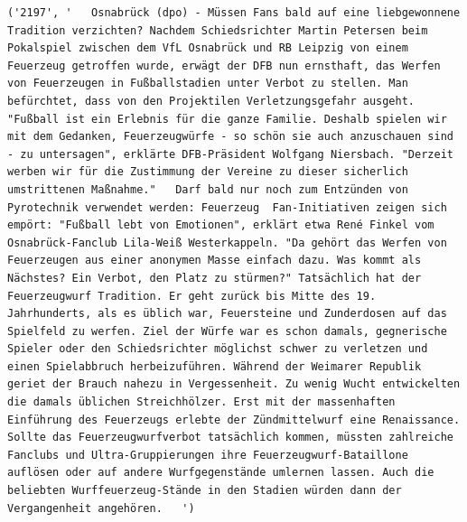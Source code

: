 \documentclass[a4paper]{scrartcl}
\begin{document}
\begin{lstlisting}
('2197', '   Osnabrück (dpo) - Müssen Fans bald auf eine liebgewonnene Tradition verzichten? Nachdem Schiedsrichter Martin Petersen beim Pokalspiel zwischen dem VfL Osnabrück und RB Leipzig von einem Feuerzeug getroffen wurde, erwägt der DFB nun ernsthaft, das Werfen von Feuerzeugen in Fußballstadien unter Verbot zu stellen. Man befürchtet, dass von den Projektilen Verletzungsgefahr ausgeht.  "Fußball ist ein Erlebnis für die ganze Familie. Deshalb spielen wir mit dem Gedanken, Feuerzeugwürfe - so schön sie auch anzuschauen sind - zu untersagen", erklärte DFB-Präsident Wolfgang Niersbach. "Derzeit werben wir für die Zustimmung der Vereine zu dieser sicherlich umstrittenen Maßnahme."   Darf bald nur noch zum Entzünden von Pyrotechnik verwendet werden: Feuerzeug  Fan-Initiativen zeigen sich empört: "Fußball lebt von Emotionen", erklärt etwa René Finkel vom Osnabrück-Fanclub Lila-Weiß Westerkappeln. "Da gehört das Werfen von Feuerzeugen aus einer anonymen Masse einfach dazu. Was kommt als Nächstes? Ein Verbot, den Platz zu stürmen?" Tatsächlich hat der Feuerzeugwurf Tradition. Er geht zurück bis Mitte des 19. Jahrhunderts, als es üblich war, Feuersteine und Zunderdosen auf das Spielfeld zu werfen. Ziel der Würfe war es schon damals, gegnerische Spieler oder den Schiedsrichter möglichst schwer zu verletzen und einen Spielabbruch herbeizuführen. Während der Weimarer Republik geriet der Brauch nahezu in Vergessenheit. Zu wenig Wucht entwickelten die damals üblichen Streichhölzer. Erst mit der massenhaften Einführung des Feuerzeugs erlebte der Zündmittelwurf eine Renaissance. Sollte das Feuerzeugwurfverbot tatsächlich kommen, müssten zahlreiche Fanclubs und Ultra-Gruppierungen ihre Feuerzeugwurf-Bataillone auflösen oder auf andere Wurfgegenstände umlernen lassen. Auch die beliebten Wurffeuerzeug-Stände in den Stadien würden dann der Vergangenheit angehören.   ') 


\end{lstlisting}
\end{document}
